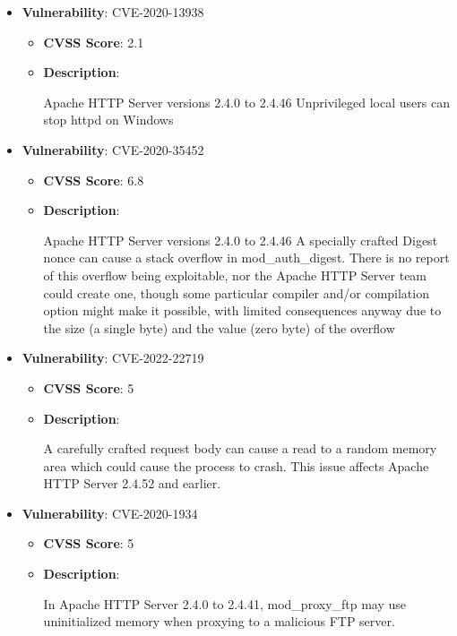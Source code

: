 \documentclass{article}
\begin{document}
\begin{itemize}
        \item \textbf{Vulnerability}: CVE-2020-13938
        \begin{itemize}
            \item \textbf{CVSS Score}:  2.1 
            \item \textbf{Description}:
            \parbox[t]{0.9\linewidth}{
                \ttfamily Apache HTTP Server versions 2.4.0 to 2.4.46 Unprivileged local users can stop httpd on Windows
            }
        \end{itemize}
    
        \item \textbf{Vulnerability}: CVE-2020-35452
        \begin{itemize}
            \item \textbf{CVSS Score}:  6.8 
            \item \textbf{Description}:
            \parbox[t]{0.9\linewidth}{
                \ttfamily Apache HTTP Server versions 2.4.0 to 2.4.46 A specially crafted Digest nonce can cause a stack overflow in mod\_auth\_digest. There is no report of this overflow being exploitable, nor the Apache HTTP Server team could create one, though some particular compiler and/or compilation option might make it possible, with limited consequences anyway due to the size (a single byte) and the value (zero byte) of the overflow
            }
        \end{itemize}
    
        \item \textbf{Vulnerability}: CVE-2022-22719
        \begin{itemize}
            \item \textbf{CVSS Score}:  5 
            \item \textbf{Description}:
            \parbox[t]{0.9\linewidth}{
                \ttfamily A carefully crafted request body can cause a read to a random memory area which could cause the process to crash. This issue affects Apache HTTP Server 2.4.52 and earlier.
            }
        \end{itemize}
    
        \item \textbf{Vulnerability}: CVE-2020-1934
        \begin{itemize}
            \item \textbf{CVSS Score}:  5 
            \item \textbf{Description}:
            \parbox[t]{0.9\linewidth}{
                \ttfamily In Apache HTTP Server 2.4.0 to 2.4.41, mod\_proxy\_ftp may use uninitialized memory when proxying to a malicious FTP server.
            }
        \end{itemize}
    

\end{itemize}
\end{document}
